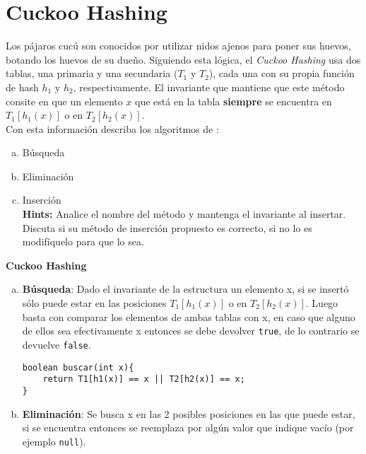 \documentclass[dcc,sol]{fcfmcourse}
\begin{document}
\section*{Cuckoo Hashing}
\begin{problems}


\problem Los pájaros cucú son conocidos por utilizar nidos ajenos para poner sus huevos, botando los huevos de su dueño. Siguiendo esta lógica, el \textit{Cuckoo Hashing} usa dos tablas, una primaria y una secundaria ($T_1$ y $T_2$), cada una con su propia función de hash $h_1$ y $h_2$, respectivamente. El invariante que mantiene que este método consite en que un elemento $x$ que está en la tabla \textbf{siempre} se encuentra en $T_1[h_1(x)]$ o en $T_2[h_2(x)]$.\\

Con esta información describa los algoritmos de :
\begin{enumerate}[a)]
    \item Búsqueda
    \item Eliminación
    \item Inserción \\\textbf{Hints:} Analice el nombre del método y mantenga el invariante al insertar. \\Discuta si su método de inserción propuesto es correcto, si no lo es modifíquelo para que lo sea.
\end{enumerate}

\newpage

{\textbf{\Large{Cuckoo Hashing}}}

\vspace{-1ex}
\begin{enumerate}[a)]
\item \textbf{Búsqueda}: Dado el invariante de la estructura un elemento x, si se insertó sólo puede estar en las posiciones $T_1[h_1(x)]$ o en $T_2[h_2(x)]$. Luego basta con comparar los elementos de ambas tablas con x, en caso que alguno de ellos sea efectivamente x entonces se debe devolver \texttt{true}, de lo contrario se devuelve \texttt{false}.

\begin{lstlisting}
boolean buscar(int x){
    return T1[h1(x)] == x || T2[h2(x)] == x;
}
\end{lstlisting}

\item \textbf{Eliminación}: Se busca x en las 2 posibles posiciones en las que puede estar, si se encuentra entonces se reemplaza por algún valor que indique vacío (por ejemplo \texttt{null}).


\end{enumerate}
\end{problems}
\end{document}
